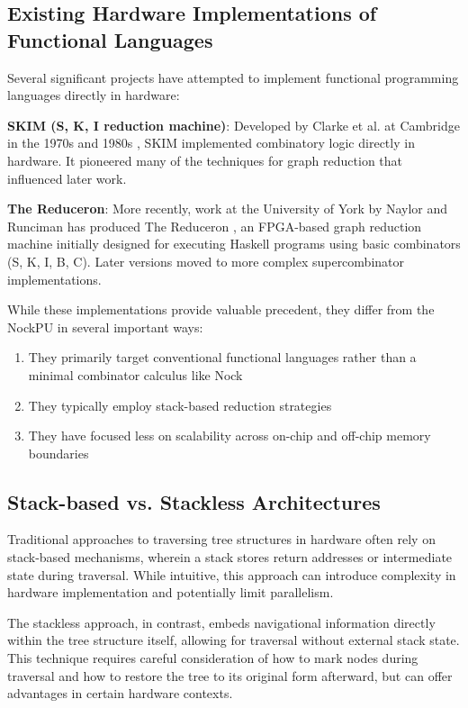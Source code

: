 \documentclass[twoside]{article}
\begin{document}
\subsection{Existing Hardware Implementations of Functional Languages}

Several significant projects have attempted to implement functional programming languages directly in hardware:

\textbf{SKIM (S, K, I reduction machine)}: Developed by Clarke et al. at Cambridge in the 1970s and 1980s \citep{Clarke1980, Norman1984}, SKIM implemented combinatory logic directly in hardware. It pioneered many of the techniques for graph reduction that influenced later work.

\textbf{The Reduceron}: More recently, work at the University of York by Naylor and Runciman has produced The Reduceron \citep{Naylor2008, Naylor2009}, an FPGA-based graph reduction machine initially designed for executing Haskell programs using basic combinators (S, K, I, B, C). Later versions moved to more complex supercombinator implementations.

While these implementations provide valuable precedent, they differ from the NockPU in several important ways:
\begin{enumerate}
  \item They primarily target conventional functional languages rather than a minimal combinator calculus like Nock
  \item They typically employ stack-based reduction strategies
  \item They have focused less on scalability across on-chip and off-chip memory boundaries
\end{enumerate}

\subsection{Stack-based vs. Stackless Architectures}

Traditional approaches to traversing tree structures in hardware often rely on stack-based mechanisms, wherein a stack stores return addresses or intermediate state during traversal. While intuitive, this approach can introduce complexity in hardware implementation and potentially limit parallelism.

The stackless approach, in contrast, embeds navigational information directly within the tree structure itself, allowing for traversal without external stack state. This technique requires careful consideration of how to mark nodes during traversal and how to restore the tree to its original form afterward, but can offer advantages in certain hardware contexts.
\end{document}

